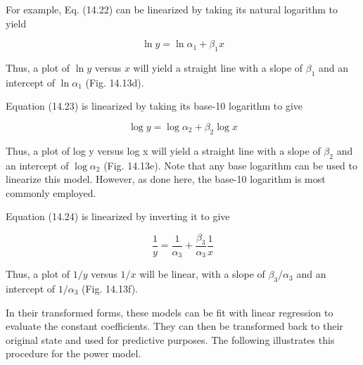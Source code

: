\documentclass[../main.tex]{subfiles}
\begin{document}
For example, Eq. (14.22) can be linearized by taking its natural logarithm to yield

\begin{equation}
	\tag{14.25}
	\ln{y} = \ln{\alpha_1} + \beta_1 x
\end{equation}

\noindent Thus, a plot of $\ln{y}$ versus $x$ will yield a straight line with a slope of $\beta_1$ and an intercept of $\ln{\alpha_1}$ (Fig. 14.13d).

Equation (14.23) is linearized by taking its base-10 logarithm to give

\begin{equation} %
	\tag{14.26}
	\log y = \log \alpha_2 + \beta_2 \log x
\end{equation} 

\noindent Thus, a plot of log y versus log x will yield a straight line with a slope of $\beta_2$ and an intercept of $\log \alpha_2$ (Fig. 14.13e). Note that any base logarithm can be used to linearize this model. However, as done here, the base-10 logarithm is most commonly employed.

Equation (14.24) is linearized by inverting it to give

\begin{equation}
	\tag{14.27}
	\frac{1}{y} = \frac{1}{\alpha_3} + \frac{\beta_3}{\alpha_3} \frac{1}{x}
\end{equation}

\noindent Thus, a plot of $1/y$ versus $1/x$ will be linear, with a slope of $\beta_3 / \alpha_3$ and an intercept of $1 / \alpha_3$ (Fig. 14.13f).

In their transformed forms, these models can be fit with linear regression to evaluate the constant coefficients. They can then be transformed back to their original state and used for predictive purposes. The following illustrates this procedure for the power model.
\end{document}
